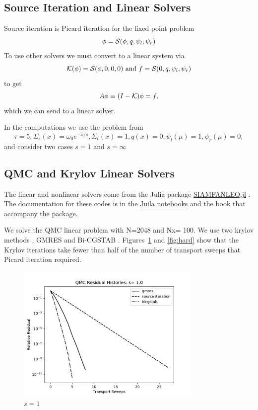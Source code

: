 \subsection{Source Iteration and Linear Solvers}
\label{subsec:source}

Source iteration is Picard iteration for the fixed point problem
\[
\phi = {\cal S}(\phi, q, \psi_l, \psi_r)
\]
To use other solvers we must convert to a linear system via
\[
{\cal K}(\phi) = {\cal S}(\phi, 0, 0, 0) \mbox{ and }
f = {\cal S}(0, q, \psi_l, \psi_r)
\]
to get
\[
A \phi \equiv (I - {\cal K}) \phi = f,
\]
which we can send to a linear solver.

In the computations we use the problem from \cite{cesinh}
\[
\tau=5, \Sigma_s(x) =\omega_0 e^{-x/s},  \Sigma_t(x) = 1, q(x) = 0, \psi_l(\mu) = 1, \psi_r(\mu) = 0,
\]
and consider two cases $s=1$ and $s=\infty$ 

\clearpage

\subsection{QMC and Krylov Linear Solvers}
\label{subsec:krylov}


The linear and nonlinear solvers come from the Julia package
\href{https://github.com/ctkelley/SIAMFANLEquations.jl}{SIAMFANLEQ.jl}
\cite{ctk:siamfanl}. The documentation for these codes is in the
\href{https://github.com/ctkelley/NotebookSIAMFANL}{Juila notebooks}
\cite{ctk:notebooknl} and the book \cite{ctk:fajulia}
that accompany the package. 


We solve the QMC linear problem with N=2048 and Nx= 100. 
We use two krylov methods \cite{ctk:roots}, GMRES \cite{gmres} and
Bi-CGSTAB \cite{bicgstab}.  Figures~\ref{fig:easy} and 
\ref{fig:hard} show that
the Krylov iterations take fewer than half of the number
of transport sweeps that Picard iteration required.

\vspace*{.25in}

\begin{figure}[h]
\centerline{
\includegraphics[width=3.5in]{FIGURES/seqone.pdf}
}
\caption{\label{fig:easy} $s=1$}
\end{figure}

